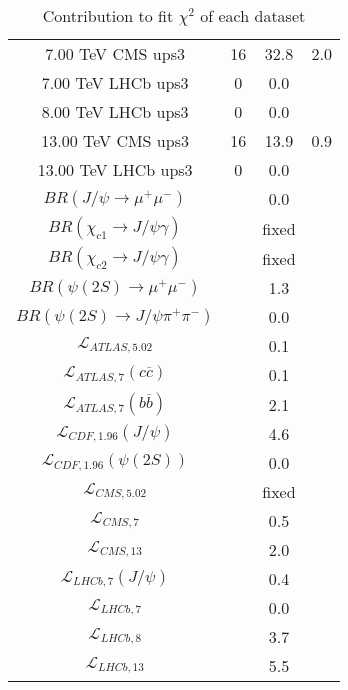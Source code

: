 \begin{table}[h!]
\begin{tabular}{c|c|c|c}
7.00 TeV CMS ups3 & 16 & 32.8 & 2.0 \\
7.00 TeV LHCb ups3 & 0 & 0.0 &  \\
8.00 TeV LHCb ups3 & 0 & 0.0 &  \\
13.00 TeV CMS ups3 & 16 & 13.9 & 0.9 \\
13.00 TeV LHCb ups3 & 0 & 0.0 &  \\
\hline
$BR(J/\psi\rightarrow\mu^+\mu^-)$ &  & 0.0 &  \\
$BR(\chi_{c1}\rightarrow J/\psi\gamma)$ &  & fixed & \\
$BR(\chi_{c2}\rightarrow J/\psi\gamma)$ &  & fixed & \\
$BR(\psi(2S)\rightarrow\mu^+\mu^-)$ &  & 1.3 &  \\
$BR(\psi(2S)\rightarrow J/\psi\pi^+\pi^-)$ &  & 0.0 &  \\
$\mathcal L_{ATLAS,5.02}$ &  & 0.1 &  \\
$\mathcal L_{ATLAS,7}(c\overline c)$ &  & 0.1 &  \\
$\mathcal L_{ATLAS,7}(b\overline b)$ &  & 2.1 &  \\
$\mathcal L_{CDF,1.96}(J/\psi)$ &  & 4.6 &  \\
$\mathcal L_{CDF,1.96}(\psi(2S))$ &  & 0.0 &  \\
$\mathcal L_{CMS,5.02}$ &  & fixed & \\
$\mathcal L_{CMS,7}$ &  & 0.5 &  \\
$\mathcal L_{CMS,13}$ &  & 2.0 &  \\
$\mathcal L_{LHCb,7}(J/\psi)$ &  & 0.4 &  \\
$\mathcal L_{LHCb,7}$ &  & 0.0 &  \\
$\mathcal L_{LHCb,8}$ &  & 3.7 &  \\
$\mathcal L_{LHCb,13}$ &  & 5.5 &  \\
\end{tabular}
\caption{Contribution to fit $\chi^2$ of each dataset}
\end{table}
